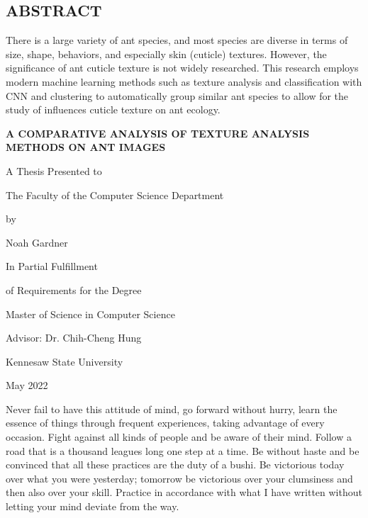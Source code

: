 \documentclass[12pt]{article}
\newcommand{\thesistitle}{
    {\Large A comparative analysis of texture analysis methods on
ant images}
}
\newcommand{\toppage}{\vspace*{0.3in}}
\begin{document}
\toppage
\begin{center}
    \section{ABSTRACT}
\end{center}
\vspace{0.5in}

\noindent There is a large variety of ant species, and most species are diverse
in terms of size, shape, behaviors, and especially skin (cuticle) textures.
However, the significance of ant cuticle texture is not widely researched. This
research employs modern machine learning methods such as texture analysis and
classification with CNN and clustering to automatically group similar ant
species to allow for the study of influences cuticle texture on ant ecology.
\newpage

\toppage
\begin{center}
    \textbf{\MakeUppercase{\thesistitle}}
    \vspace{1in}

    A Thesis Presented to

    The Faculty of the Computer Science Department
    \vspace{1in}

    by
    \vspace{0.5in}

    Noah Gardner
    \vspace{1in}

    In Partial Fulfillment

    of Requirements for the Degree

    Master of Science in Computer Science
    \vspace{0.5in}

    Advisor: Dr. Chih-Cheng Hung
    \vspace{0.5in}

    Kennesaw State University

    May 2022
\end{center}
\newpage

\toppage
Never fail to have this attitude of mind, go forward without hurry, learn the
essence of things through frequent experiences, taking advantage of every
occasion. Fight against all kinds of people and be aware of their mind. Follow a
road that is a thousand leagues long one step at a time. Be without haste and be
convinced that all these practices are the duty of a bushi. Be victorious today
over what you were yesterday; tomorrow be victorious over your clumsiness and
then also over your skill. Practice in accordance with what I have written
without letting your mind deviate from the way.
\end{document}
